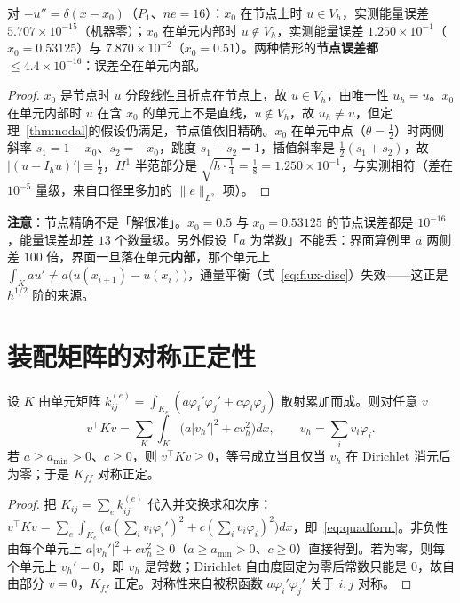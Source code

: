 \begin{corollary}
\label{cor:point}
对 $-u''=\delta(x-x_0)$（$P_1$、$ne=16$）：$x_0$ 在节点上时 $u\in V_h$，实测能量误差
$5.707\times10^{-15}$（机器零）；$x_0$ 在单元内部时 $u\notin V_h$，实测能量误差
$1.250\times10^{-1}$（$x_0=0.53125$）与 $7.870\times10^{-2}$（$x_0=0.51$）。两种情形的\textbf{节点误差都
$\le4.4\times10^{-16}$}：误差全在单元内部。
\end{corollary}
\begin{proof}
$x_0$ 是节点时 $u$ 分段线性且折点在节点上，故 $u\in V_h$，由唯一性 $u_h=u$。$x_0$ 在单元内部时 $u$ 在含 $x_0$ 的单元上不是直线，$u\notin
V_h$，故 $u_h\ne u$，但定理~\ref{thm:nodal}的假设仍满足，节点值依旧精确。$x_0$ 在单元中点（$\theta=\frac12$）时两侧斜率
$s_1=1-x_0$、$s_2=-x_0$，跳度 $s_1-s_2=1$，插值斜率是 $\frac12(s_1+s_2)$，故
$|(u-I_hu)'|\equiv\frac12$，$H^1$ 半范部分是
$\sqrt{h\cdot\frac14}=\frac18=1.250\times10^{-1}$，与实测相符（差在 $10^{-5}$ 量级，来自口径里多加的 $\|e\|_{L^2}$
项）。
\end{proof}

\textbf{注意}：节点精确不是「解很准」。$x_0=0.5$ 与 $x_0=0.53125$ 的节点误差都是 $10^{-16}$，能量误差却差 $13$ 个数量级。另外假设「$a$
为常数」不能丢：界面算例里 $a$ 两侧差 $100$ 倍，界面一旦落在单元\textbf{内部}，那个单元上 $\int_Ka u'\ne
a\bigl(u(x_{i+1})-u(x_i)\bigr)$，通量平衡（式~\eqref{eq:flux-disc}）失效——这正是 $h^{1/2}$ 阶的来源。

\section{装配矩阵的对称正定性}

\begin{theorem}[二次型恒等式与正定性]
\label{thm:spd}
设 $K$ 由单元矩阵 $k^{(e)}_{ij}=\int_{K_e}(a\varphi_i'\varphi_j'+c\varphi_i\varphi_j)$ 散射累加而成。则对任意 $v$
\begin{equation}
  v^{\top}Kv=\sum_K\int_K\bigl(a|v_h'|^2+cv_h^2\bigr)dx,\qquad v_h=\sum_iv_i\varphi_i .
  \label{eq:quadform}
\end{equation}
若 $a\ge a_{\min}>0$、$c\ge0$，则 $v^{\top}Kv\ge0$，等号成立当且仅当 $v_h$ 在 Dirichlet 消元后为零；于是 $K_{ff}$
对称正定。
\end{theorem}
\begin{proof}
把 $K_{ij}=\sum_ek^{(e)}_{ij}$
代入并交换求和次序：$v^{\top}Kv=\sum_e\int_{K_e}\bigl(a(\sum_iv_i\varphi_i')^2+c(\sum_iv_i\varphi_i)^2\bigr)dx$，即~\eqref{eq:quadform}。非负性由每个单元上 $a|v_h'|^2+cv_h^2\ge0$（$a\ge a_{\min}>0$、$c\ge0$）直接得到。若为零，则每个单元上
$v_h'=0$，即 $v_h$ 是常数；Dirichlet 自由度固定为零后常数只能是 $0$，故自由部分 $v=0$，$K_{ff}$ 正定。对称性来自被积函数
$a\varphi_i'\varphi_j'$ 关于 $i,j$ 对称。
\end{proof}


